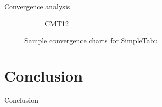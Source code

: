 \documentclass[9pt]{beamer}
\begin{document}
\begin{frame}{Convergence analysis}
\begin{figure}[ht]
\begin{subfigure}[b]{0.48\linewidth}
        \caption{CMT12}
    \end{subfigure}
    \caption{Sample convergence charts for SimpleTabu}
\end{figure}
\end{frame}

\section{Conclusion}
\begin{frame}{Conclusion}

\end{frame}
\end{document}
